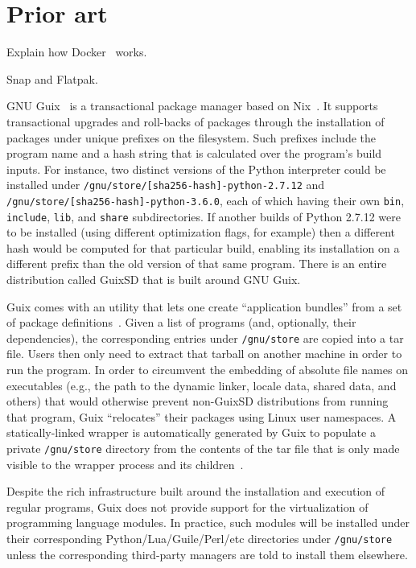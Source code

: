 \documentclass[sigplan, anonymous, 10pt]{acmart}
\begin{document}
\section{Prior art}
Explain how Docker~\cite{fink2014:docker} works.
\lipsum[1-3]

Snap and Flatpak.
\lipsum[4-6]

GNU Guix~\cite{courtes2013:guix} is a transactional package manager based on Nix~\cite{dolstra2004:nix}.
It supports transactional upgrades and
roll-backs of packages through the installation of packages under unique prefixes on the filesystem.
Such prefixes include the program name and a hash string that is calculated over the program's
build inputs. For instance, two distinct versions of the Python interpreter could be installed
under \texttt{/gnu/store/[sha256-hash]-python-2.7.12} and \texttt{/gnu/store/[sha256-hash]-python-3.6.0},
each of which having their own \texttt{bin}, \texttt{include}, \texttt{lib}, and \texttt{share}
subdirectories. If another builds of Python 2.7.12 were to be installed (using different optimization
flags, for example) then a different hash would be computed for that particular build, enabling its
installation on a different prefix than the old version of that same program. There is an entire
distribution called GuixSD that is built around GNU Guix.

Guix comes with an utility that lets one create ``application bundles'' from a set of package
definitions~\cite{gnu2017:bundles}. Given a list of programs (and, optionally, their dependencies),
the corresponding entries under \texttt{/gnu/store} are copied into a tar file. Users then only
need to extract that tarball on another machine in order to run the program. In order to circumvent
the embedding of absolute file names on executables (e.g., the path to the dynamic linker, locale
data, shared data, and others) that would otherwise prevent non-GuixSD distributions from running
that program, Guix ``relocates'' their packages using Linux user namespaces. A statically-linked
wrapper is automatically generated by Guix to populate a private \texttt{/gnu/store} directory
from the contents of the tar file that is only made visible to the wrapper process and its
children~\cite{gnu2018:tarballs}.

Despite the rich infrastructure built around the installation and execution of regular programs,
Guix does not provide support for the virtualization of programming language modules. In practice,
such modules will be installed under their corresponding Python/Lua/Guile/Perl/etc directories
under \texttt{/gnu/store} unless the corresponding third-party managers are told to install them
elsewhere.
\end{document}
